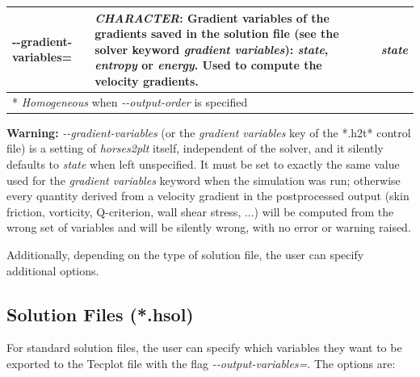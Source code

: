 \documentclass[a4paper,10pt]{report}
\begin{document}
\begin{longtable}{|p{4cm}|p{10cm}|p{2.2cm}|}
-{}-gradient-variables= 	&
			\textit{CHARACTER}: Gradient variables of the gradients saved in the solution file (see the solver keyword \textit{gradient variables}): \textit{state}, \textit{entropy} or \textit{energy}. Used to compute the velocity gradients. &
							\textit{state}  \\ \hline
\multicolumn{3}{p{16.4cm}}{*  \textit{Homogeneous} when \textit{-{}-output-order} is specified} \\

\end{longtable}

\textbf{Warning:} \textit{-{}-gradient-variables} (or the \textit{gradient variables} key of the *.h2t* control file) is a setting of \textit{horses2plt} itself, independent of the solver, and it silently defaults to \textit{state} when left unspecified. It must be set to exactly the same value used for the \textit{gradient variables} keyword when the simulation was run; otherwise every quantity derived from a velocity gradient in the postprocessed output (skin friction, vorticity, Q-criterion, wall shear stress, ...) will be computed from the wrong set of variables and will be silently wrong, with no error or warning raised.

Additionally, depending on the type of solution file, the user can specify additional options.

\subsection{Solution Files (*.hsol)} \label{PostProc:hsol}

For standard solution files, the user can specify which variables they want to be exported to the Tecplot file with the flag \textit{-{}-output-variables=}. 
The options are:
\end{document}
